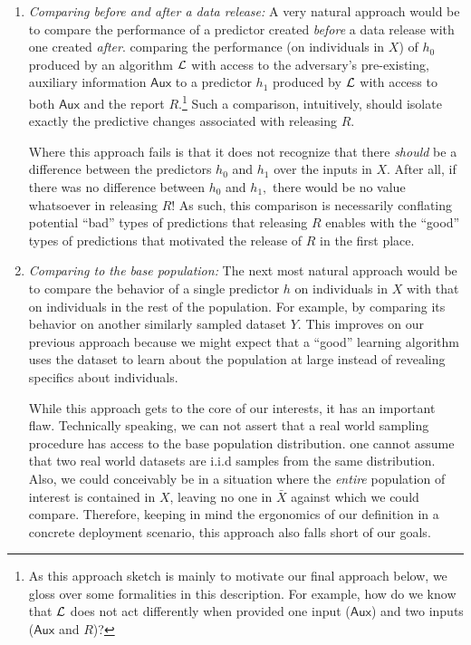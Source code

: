 \begin{enumerate}[(1),leftmargin=*]

    \item \emph{Comparing before and after a data release:}  A very natural approach  would be to compare the performance of a predictor created \emph{before} a data release with one created \emph{after}. \ie comparing the performance (on individuals in $X$) of $h_0$ produced by an algorithm $\mathcal{L}$ with access to the adversary's pre-existing, auxiliary information $\mathsf{Aux}$ to a predictor $h_1$ produced by $\mathcal{L}$ with access to both $\mathsf{Aux}$ and the report $R$.\footnote{As this approach sketch is mainly to motivate our final approach below, we gloss over some formalities in this description.  For example, how do we know that $\mathcal{L}$ does not act differently when provided one input ($\mathsf{Aux}$) and two inputs ($\mathsf{Aux}$ and $R$)?} 
    Such a comparison, intuitively, should isolate exactly the predictive changes associated with releasing $R$.

    Where this approach fails is that it does not recognize that there \emph{should} be a difference between the predictors $h_0$ and $h_1$ over the inputs in $X$.  After all, if there was no difference between $h_0$ and $h_1,$ there would be no value whatsoever in releasing $R$! As such, this comparison is necessarily conflating potential ``bad'' types of predictions that releasing $R$ enables with the ``good'' types of predictions that motivated the release of $R$ in the first place.

    \item \emph{Comparing to the base population:} The next most natural approach would be to compare the behavior of a single predictor $h$ on individuals in $X$ with that on individuals in the rest of the population. For example, by comparing its behavior on another similarly sampled dataset $Y$. This improves on our previous approach because we might expect that a ``good'' learning algorithm uses the dataset to learn about the population at large instead of revealing specifics about individuals.

    While this approach gets to the core of our interests, it has an important flaw. Technically speaking, we can not assert that a real world sampling procedure has access to the base population distribution.
    \ie one cannot assume that two real world datasets are i.i.d samples from the same distribution. Also, we could conceivably be in a situation where the \emph{entire} population of interest is contained in $X$, leaving no one in $\bar{X}$ against which we could compare.  Therefore, keeping in mind the ergonomics of our definition in a concrete deployment scenario, 
    this approach also falls short of our goals.   
\end{enumerate}


